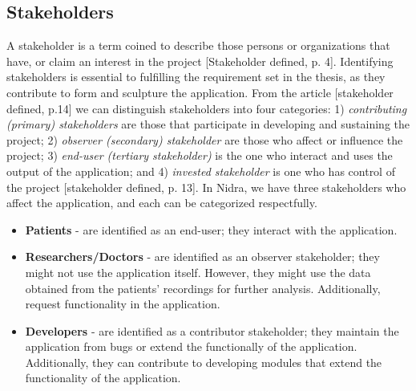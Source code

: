 \subsection{Stakeholders}
A stakeholder is a term coined to describe those persons or organizations that have, or claim an interest in the project [Stakeholder defined, p. 4].  Identifying stakeholders is essential to fulfilling the requirement set in the thesis, as they contribute to form and sculpture the application. From the article [stakeholder defined, p.14] we can distinguish stakeholders into four categories: 1) \textit{contributing (primary) stakeholders} are those that participate in developing and sustaining the project; 2) \textit{observer (secondary) stakeholder} are those who affect or influence the project;  3) \textit{end-user (tertiary stakeholder)} is the one who interact and uses the output of the application; and 4) \textit{invested stakeholder} is one who has control of the project  [stakeholder defined, p. 13]. In Nidra, we have three stakeholders who affect the application, and each can be categorized respectfully.
\begin{itemize}
    \item \textbf{Patients} - are identified as an end-user; they interact with the application.  
    \item \textbf{Researchers/Doctors} - are identified as an observer stakeholder; they might not use the application itself. However, they might use the data obtained from the patients' recordings for further analysis. Additionally, request functionality in the application.
    \item \textbf{Developers} - are identified as a contributor stakeholder; they maintain the application from bugs or extend the functionally of the application. Additionally, they can contribute to developing modules that extend the functionality of the application. 
\end{itemize}